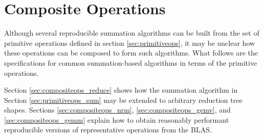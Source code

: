 \section{Composite Operations}
  \label{sec:compositeops}
  Although several reproducible summation algorithms can be built from the set of primitive operations defined in section \ref{sec:primitiveops}, it may be unclear how these operations can be composed to form such algorithms. What follows are the specifications for common summation-based algorithms in terms of the primitive operations.

  Section \ref{sec:compositeops_reduce} shows how the summation algorithm in Section \ref{sec:primitiveops_sum} may be extended to arbitrary reduction tree shapes. Sections \ref{sec:compositeops_nrm}, \ref{sec:compositeops_gemv}, and \ref{sec:compositeops_gemm} explain how to obtain reasonably performant reproducible versions of representative operations from the BLAS.
    
    
    
    
